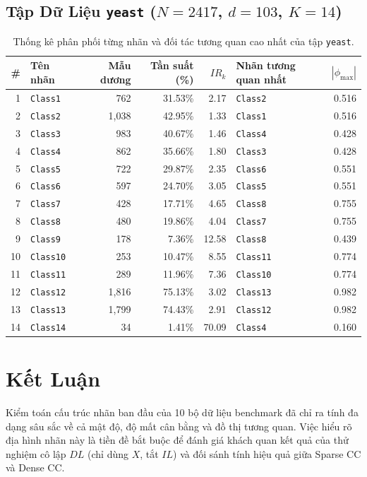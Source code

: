 \documentclass[11pt,a4paper]{article}
\begin{document}
\subsection{Tập Dữ Liệu \texttt{yeast} ($N=2417$, $d=103$, $K=14$)}
\begin{table}[htbp]
\centering
\footnotesize
\caption{Thống kê phân phối từng nhãn và đối tác tương quan cao nhất của tập \texttt{yeast}.}
\begin{tabularx}{0.95\textwidth}{r l r r r l r}
\toprule
\textbf{\#} & \textbf{Tên nhãn} & \textbf{Mẫu dương} & \textbf{Tần suất (\%)} & \textbf{$IR_k$} & \textbf{Nhãn tương quan nhất} & \textbf{$|\phi_{\max}|$} \\
\midrule
1 & \texttt{Class1} & 762 & 31.53\% & 2.17 & \texttt{Class2} & 0.516 \\
2 & \texttt{Class2} & 1,038 & 42.95\% & 1.33 & \texttt{Class1} & 0.516 \\
3 & \texttt{Class3} & 983 & 40.67\% & 1.46 & \texttt{Class4} & 0.428 \\
4 & \texttt{Class4} & 862 & 35.66\% & 1.80 & \texttt{Class3} & 0.428 \\
5 & \texttt{Class5} & 722 & 29.87\% & 2.35 & \texttt{Class6} & 0.551 \\
6 & \texttt{Class6} & 597 & 24.70\% & 3.05 & \texttt{Class5} & 0.551 \\
7 & \texttt{Class7} & 428 & 17.71\% & 4.65 & \texttt{Class8} & 0.755 \\
8 & \texttt{Class8} & 480 & 19.86\% & 4.04 & \texttt{Class7} & 0.755 \\
9 & \texttt{Class9} & 178 & 7.36\% & 12.58 & \texttt{Class8} & 0.439 \\
10 & \texttt{Class10} & 253 & 10.47\% & 8.55 & \texttt{Class11} & 0.774 \\
11 & \texttt{Class11} & 289 & 11.96\% & 7.36 & \texttt{Class10} & 0.774 \\
12 & \texttt{Class12} & 1,816 & 75.13\% & 3.02 & \texttt{Class13} & 0.982 \\
13 & \texttt{Class13} & 1,799 & 74.43\% & 2.91 & \texttt{Class12} & 0.982 \\
14 & \texttt{Class14} & 34 & 1.41\% & 70.09 & \texttt{Class4} & 0.160 \\
\bottomrule
\end{tabularx}
\end{table}

\section{Kết Luận}
Kiểm toán cấu trúc nhãn ban đầu của 10 bộ dữ liệu benchmark đã chỉ ra tính đa dạng sâu sắc về cả mật độ, độ mất cân bằng và đồ thị tương quan. Việc hiểu rõ địa hình nhãn này là tiền đề bắt buộc để đánh giá khách quan kết quả của thử nghiệm cô lập $DL$ (chỉ dùng $X$, tắt $IL$) và đối sánh tính hiệu quả giữa Sparse CC và Dense CC.
\end{document}
